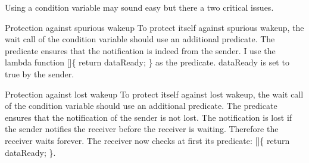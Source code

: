 
Using a condition variable may sound easy but there a two critical issues.

\begin{myWarning}{Protection against spurious wakeup}
To protect itself against spurious wakeup, the wait call of the condition variable should use an additional predicate. The predicate ensures that the notification is indeed from the sender. I use the lambda function []\{ return dataReady; \} as the predicate. dataReady is set to true by the sender.
\end{myWarning}



\begin{myWarning}{Protection against lost wakeup}
To protect itself against lost wakeup, the wait call of the condition variable should use an additional predicate. The predicate ensures that the notification of the sender is not lost. The notification is lost if the sender notifies the receiver before the receiver is waiting. Therefore the receiver waits forever. The receiver now checks at first its predicate: []\{ return dataReady; \}.
\end{myWarning}
